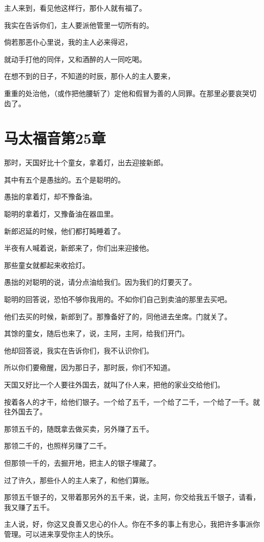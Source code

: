\documentclass[12pt,oneside]{book}
\begin{document}
主人来到，看见他这样行，那仆人就有福了。

我实在告诉你们，主人要派他管里一切所有的。

倘若那恶仆心里说，我的主人必来得迟，

就动手打他的同伴，又和酒醉的人一同吃喝。

在想不到的日子，不知道的时辰，那仆人的主人要来，

重重的处治他，（或作把他腰斩了）定他和假冒为善的人同罪。在那里必要哀哭切齿了。

\chapter{马太福音第25章}
那时，天国好比十个童女，拿着灯，出去迎接新郎。

其中有五个是愚拙的。五个是聪明的。

愚拙的拿着灯，却不豫备油。

聪明的拿着灯，又豫备油在器皿里。

新郎迟延的时候，他们都打盹睡着了。

半夜有人喊着说，新郎来了，你们出来迎接他。

那些童女就都起来收拾灯。

愚拙的对聪明的说，请分点油给我们。因为我们的灯要灭了。

聪明的回答说，恐怕不够你我用的。不如你们自己到卖油的那里去买吧。

他们去买的时候，新郎到了。那豫备好了的，同他进去坐席。门就关了。

其馀的童女，随后也来了，说，主阿，主阿，给我们开门。

他却回答说，我实在告诉你们，我不认识你们。

所以你们要儆醒，因为那日子，那时辰，你们不知道。

天国又好比一个人要往外国去，就叫了仆人来，把他的家业交给他们。

按着各人的才干，给他们银子。一个给了五千，一个给了二千，一个给了一千。就往外国去了。

那领五千的，随既拿去做买卖，另外赚了五千。

那领二千的，也照样另赚了二千。

但那领一千的，去掘开地，把主人的银子埋藏了。

过了许久，那些仆人的主人来了，和他们算账。

那领五千银子的，又带着那另外的五千来，说，主阿，你交给我五千银子，请看，我又赚了五千。

主人说，好，你这又良善又忠心的仆人。你在不多的事上有忠心，我把许多事派你管理。可以进来享受你主人的快乐。
\end{document}
